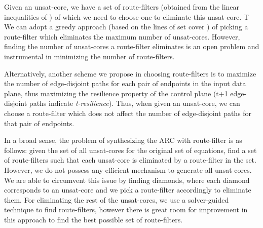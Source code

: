 
Given an unsat-core, we have a set of route-filters (obtained
from the linear inequalities of ) of which we 
need to choose one to eliminate this unsat-core. T
We can 
adopt a greedy approach (based on the lines of 
set cover \cite{}) of picking a route-filter which 
eliminates the maximum number of unsat-cores. However, 
finding the number of unsat-cores a route-filter eliminates
is an open problem and instrumental in minimizing the number 
of route-filters.

Alternatively, another scheme we propose in choosing route-filters
is to maximize the number of edge-disjoint paths for each pair of
endpoints in the input data plane, thus maximizing the resilience 
property of the control plane (t+1 edge-disjoint paths indicate
{\em t-resilience}). Thus, when given an unsat-core, we can choose
a route-filter which does not affect the number of edge-disjoint paths
for that pair of endpoints.

In a broad sense, the problem of synthesizing the
ARC with route-filter is as follows: given the set of all
unsat-cores for the original set of equations, find a 
set of route-filters such that each unsat-core is eliminated
by a route-filter in the set. However, we do not possess any
efficient mechanism to generate all unsat-cores. 
We are able to circumvent
this issue by finding diamonds, where each diamond corresponds
to an unsat-core and we pick a route-filter accordingly to 
eliminate them. For eliminating the 
rest of the unsat-cores, we use a solver-guided technique
to find route-filters, however there is 
great room for improvement in this approach to find the best possible
set of route-filters. 


